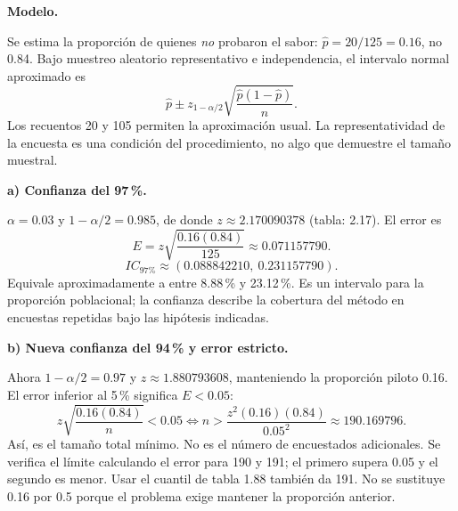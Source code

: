 \textbf{Modelo.}\par\nopagebreak[4]
Se estima la proporción de quienes \emph{no} probaron el sabor: $\widehat p=20/125=0.16$, no 0.84. Bajo muestreo aleatorio representativo e independencia, el intervalo normal aproximado es
\[
\widehat p\pm z_{1-\alpha/2}\sqrt{\frac{\widehat p(1-\widehat p)}n}.
\]
Los recuentos 20 y 105 permiten la aproximación usual. La representatividad de la encuesta es una condición del procedimiento, no algo que demuestre el tamaño muestral.

\textbf{a) Confianza del 97\,\%.}\par\nopagebreak[4]
$\alpha=0.03$ y $1-\alpha/2=0.985$, de donde $z\approx2.170090378$ (tabla: 2.17). El error es
\[
E=z\sqrt{\frac{0.16(0.84)}{125}}\approx0.071157790.
\]
\[
\boxed{IC_{\text{97\%}}\approx(0.088842210,\ 0.231157790).}
\]
Equivale aproximadamente a entre 8.88\,\% y 23.12\,\%. Es un intervalo para la proporción poblacional; la confianza describe la cobertura del método en encuestas repetidas bajo las hipótesis indicadas.

\textbf{b) Nueva confianza del 94\,\% y error estricto.}\par\nopagebreak[4]
Ahora $1-\alpha/2=0.97$ y $z\approx1.880793608$, manteniendo la proporción piloto 0.16. El error inferior al 5\,\% significa $E<0.05$:
\[
z\sqrt{\frac{0.16(0.84)}n}<0.05
\iff n>\frac{z^2(0.16)(0.84)}{0.05^2}\approx190.169796.
\]
Así,  es el tamaño total mínimo. No es el número de encuestados adicionales. Se verifica el límite calculando el error para 190 y 191; el primero supera 0.05 y el segundo es menor. Usar el cuantil de tabla 1.88 también da 191. No se sustituye 0.16 por 0.5 porque el problema exige mantener la proporción anterior.
